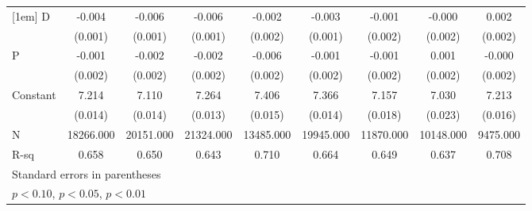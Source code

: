 \begin{table}[htbp]
\begin{tabular}{l*{8}{c}}
[1em]
D                   &      -0.004\sym{***}&      -0.006\sym{***}&      -0.006\sym{***}&      -0.002         &      -0.003\sym{**} &      -0.001         &      -0.000         &       0.002         \\
                    &     (0.001)         &     (0.001)         &     (0.001)         &     (0.002)         &     (0.001)         &     (0.002)         &     (0.002)         &     (0.002)         \\
[1em]
P                   &      -0.001         &      -0.002         &      -0.002         &      -0.006\sym{***}&      -0.001         &      -0.001         &       0.001         &      -0.000         \\
                    &     (0.002)         &     (0.002)         &     (0.002)         &     (0.002)         &     (0.002)         &     (0.002)         &     (0.002)         &     (0.002)         \\
[1em]
Constant            &       7.214\sym{***}&       7.110\sym{***}&       7.264\sym{***}&       7.406\sym{***}&       7.366\sym{***}&       7.157\sym{***}&       7.030\sym{***}&       7.213\sym{***}\\
                    &     (0.014)         &     (0.014)         &     (0.013)         &     (0.015)         &     (0.014)         &     (0.018)         &     (0.023)         &     (0.016)         \\
\hline
N                   &   18266.000         &   20151.000         &   21324.000         &   13485.000         &   19945.000         &   11870.000         &   10148.000         &    9475.000         \\
R-sq                &       0.658         &       0.650         &       0.643         &       0.710         &       0.664         &       0.649         &       0.637         &       0.708         \\
\hline\hline
\multicolumn{9}{l}{\footnotesize Standard errors in parentheses}\\
\multicolumn{9}{l}{\footnotesize \sym{*} \(p<0.10\), \sym{**} \(p<0.05\), \sym{***} \(p<0.01\)}\\
\end{tabular}
\end{table}
